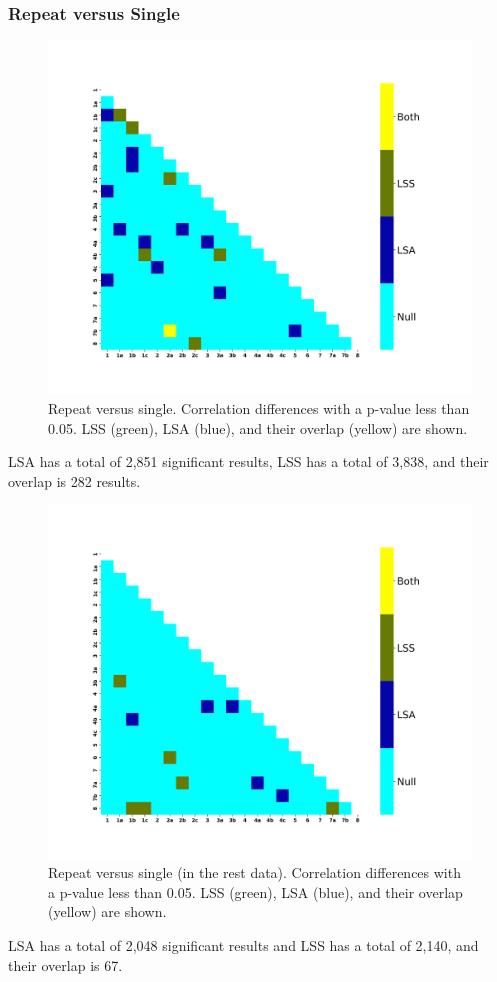 \documentclass[10pt,letterpaper]{article}
\begin{document}
\subsubsection*{Repeat versus Single}
\begin{figure}[H]
  \centering
  \includegraphics[width=\textwidth]{data-task_atlas-activation_contrast-repeatXsingle}
  \caption{
    Repeat versus single. Correlation differences with a p-value less than 0.05.
    LSS (green), LSA (blue), and their overlap (yellow) are shown.
  }
  \label{fig:repeatvsingle}
\end{figure}
LSA has a total of 2,851 significant results, LSS has a total of 3,838,
and their overlap is 282 results.

\begin{figure}[H]
  \centering
  \includegraphics[width=\textwidth]{data-null_atlas-activation_contrast-repeatXsingle}
  \caption{
    Repeat versus single (in the rest data). Correlation differences with a p-value less than 0.05.
    LSS (green), LSA (blue), and their overlap (yellow) are shown.
  }
  \label{fig:restrepeatvsingle}
\end{figure}
LSA has a total of 2,048 significant results and LSS has a total of 2,140,
and their overlap is 67.
\end{document}
